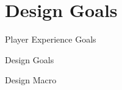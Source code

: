 \part{Design Goals}
\frame{\partpage}

\begin{frame}{Player Experience Goals}
	\begin{itemize}
	\end{itemize}
\end{frame}

\begin{frame}{Design Goals}
\end{frame}

\begin{frame}{Design Macro}
\end{frame}

